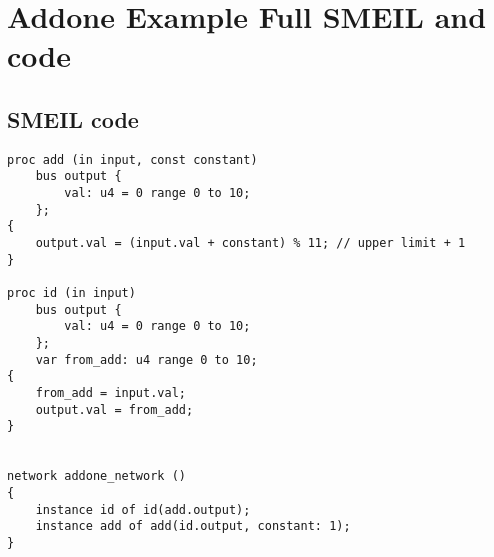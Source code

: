 \chapter{Addone Example Full SMEIL and \cspm code}
\label{app:addone}
\section*{SMEIL code}
\begin{verbatim}
proc add (in input, const constant)
    bus output {
        val: u4 = 0 range 0 to 10;
    };
{
    output.val = (input.val + constant) % 11; // upper limit + 1
}

proc id (in input)
    bus output {
        val: u4 = 0 range 0 to 10;
    };
    var from_add: u4 range 0 to 10;
{
    from_add = input.val;
    output.val = from_add;
}


network addone_network ()
{
    instance id of id(add.output);
    instance add of add(id.output, constant: 1);
}
\end{verbatim}

